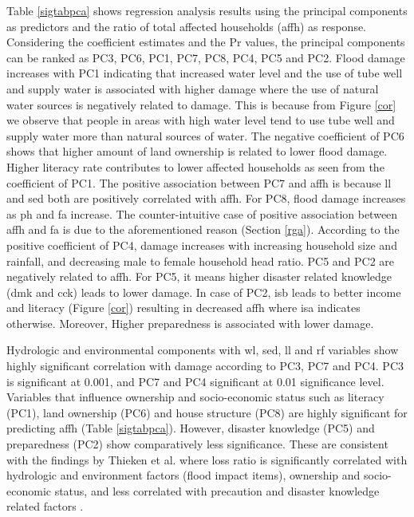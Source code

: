 \documentclass[preprint,review,12pt]{elsarticle}
\begin{document}

Table \ref{sigtabpca} shows regression analysis results using the principal components as predictors and the ratio of total affected households (affh) as response. Considering the coefficient estimates and the Pr values, the principal components can be ranked as PC3, PC6, PC1, PC7, PC8, PC4, PC5 and PC2. Flood damage increases with PC1 indicating that increased water level and the use of tube well and supply water is associated with higher damage where the use of natural water sources is negatively related to damage. This is because from Figure \ref{cor} we observe that people in areas with high water level tend to use tube well and supply water more than natural sources of water. The negative coefficient of PC6 shows that higher amount of land ownership is related to lower flood damage. Higher literacy rate contributes to lower affected households as seen from the coefficient of PC1. The positive association between PC7 and affh is because ll and sed both are positively correlated with affh. For PC8, flood damage increases as ph and fa increase. The counter-intuitive case of positive association between affh and fa is due to the aforementioned reason (Section \ref{rga}). According to the positive coefficient of PC4, damage increases with increasing household size and rainfall, and decreasing male to female household head ratio. PC5 and PC2 are negatively related to affh. For PC5, it means higher disaster related knowledge (dmk and cck) leads to lower damage. In case of PC2, isb leads to better income and literacy (Figure \ref{cor}) resulting in decreased affh where isa indicates otherwise. Moreover, Higher preparedness is associated with lower damage. 

Hydrologic and environmental components with wl, sed, ll and rf variables show highly significant correlation with damage according to PC3, PC7 and PC4. PC3 is significant at 0.001, and PC7 and PC4 significant at 0.01 significance level. Variables that influence ownership and socio-economic status such as literacy (PC1), land ownership (PC6) and house structure (PC8) are highly significant for predicting affh (Table \ref{sigtabpca}). However, disaster knowledge (PC5) and preparedness (PC2) show comparatively less significance. These are consistent with the findings by Thieken et al. where loss ratio is significantly correlated with hydrologic and environment factors (flood impact items), ownership and socio-economic status, and less correlated with precaution and disaster knowledge related factors \cite{thieken2005flood}.        
\end{document}
